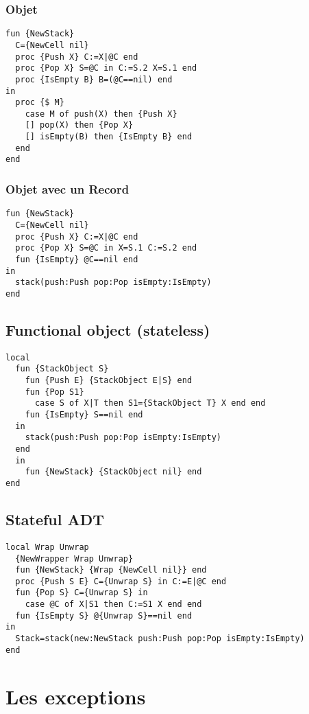 \documentclass{report}
\begin{document}
\subsubsection{Objet}
\begin{lstlisting}[escapechar=\%]
fun {NewStack} 
  C={NewCell nil} 
  proc {Push X} C:=X|@C end 
  proc {Pop X} S=@C in C:=S.2 X=S.1 end 
  proc {IsEmpty B} B=(@C==nil) end
in
  proc {$ M}
    case M of push(X) then {Push X} 
    [] pop(X) then {Pop X} 
    [] isEmpty(B) then {IsEmpty B} end
  end
end
\end{lstlisting}

\subsubsection{Objet avec un Record}
\begin{lstlisting}[escapechar=\%]
fun {NewStack} 
  C={NewCell nil} 
  proc {Push X} C:=X|@C end 
  proc {Pop X} S=@C in X=S.1 C:=S.2 end 
  fun {IsEmpty} @C==nil end
in 
  stack(push:Push pop:Pop isEmpty:IsEmpty)
end
\end{lstlisting}

\subsection{Functional object (stateless)}
\begin{lstlisting}[escapechar=\%]
local 
  fun {StackObject S} 
    fun {Push E} {StackObject E|S} end 
    fun {Pop S1} 
      case S of X|T then S1={StackObject T} X end end 
    fun {IsEmpty} S==nil end
  in
    stack(push:Push pop:Pop isEmpty:IsEmpty) 
  end 
  in 
    fun {NewStack} {StackObject nil} end
end
\end{lstlisting}

\subsection{Stateful ADT}
\begin{lstlisting}[escapechar=\%]
local Wrap Unwrap 
  {NewWrapper Wrap Unwrap} 
  fun {NewStack} {Wrap {NewCell nil}} end 
  proc {Push S E} C={Unwrap S} in C:=E|@C end 
  fun {Pop S} C={Unwrap S} in 
    case @C of X|S1 then C:=S1 X end end 
  fun {IsEmpty S} @{Unwrap S}==nil end
in 
  Stack=stack(new:NewStack push:Push pop:Pop isEmpty:IsEmpty)
end
\end{lstlisting}

\section{Les exceptions}
\end{document}
